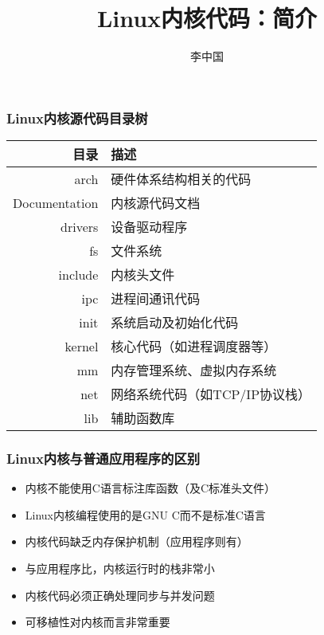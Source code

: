 \documentclass[xcolor=svgnames]{beamer}
\begin{document}
\begin{CJK*}{UTF8}{gbsn}


\title{Linux内核代码：简介}
\author{李中国}

\begin{frame}
\maketitle
\end{frame}

\begin{frame}[fragile]
\frametitle{Linux内核源代码目录树}
\begin{tabular}{|r l|} 
\hline 
目录 & 描述 \\
\hline 
arch & 硬件体系结构相关的代码 \\
Documentation & 内核源代码文档 \\
drivers & 设备驱动程序 \\
fs & 文件系统 \\
include & 内核头文件 \\
ipc & 进程间通讯代码\\
init & 系统启动及初始化代码 \\
kernel & 核心代码（如进程调度器等）\\
mm & 内存管理系统、虚拟内存系统 \\
net & 网络系统代码（如TCP/IP协议栈）\\
lib & 辅助函数库 \\
\hline 
\end{tabular} 
\end{frame}

\begin{frame}[fragile]
\frametitle{Linux内核与普通应用程序的区别}
\begin{itemize}
\item 内核不能使用C语言标注库函数（及C标准头文件）
\item Linux内核编程使用的是GNU C而不是标准C语言
\item 内核代码缺乏内存保护机制（应用程序则有）
\item 与应用程序比，内核运行时的栈非常小
\item 内核代码必须正确处理同步与并发问题
\item 可移植性对内核而言非常重要
\end{itemize}
\end{frame}


\end{CJK*}
\end{document}
